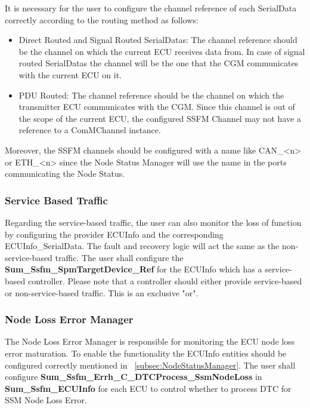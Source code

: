 It is necessary for the user to configure the channel reference of each SerialData correctly according to the routing method as follows:

\begin{itemize}
    \item Direct Routed and Signal Routed SerialDatas: The channel reference should be the channel on which the current ECU receives data from. In case of signal routed SerialDatas the channel will be the one that the CGM communicates with the current ECU on it.
    \item PDU Routed: The channel reference should be the channel on which the transmitter ECU communicates with the CGM. Since this channel is out of the scope of the current ECU, the configured SSFM Channel may not have a reference to a ComMChannel instance. 
\end{itemize}

Moreover, the SSFM channels should be configured with a name like CAN\_<n> or ETH\_<n> since the Node Status Manager will use the name in the ports communicating the Node Status.

\subsubsection{Service Based Traffic}
\label{subsec:LossOfCommService}
Regarding the service-based traffic, the user can also monitor the loss of function by configuring the provider ECUInfo and the corresponding ECUInfo\_SerialData.
The fault and recovery logic will act the same as the non-service-based traffic. The user shall configure the \\ \textbf{Sum\_Ssfm\_SpmTargetDevice\_Ref}
for the ECUInfo which has a service-based controller. Please note that a controller should either provide service-based or non-service-based traffic. This is an exclusive "or".


\subsubsection{Node Loss Error Manager}
\label{subsec:NodeLossErrorManager}

The Node Loss Error Manager is responsible for monitoring the ECU node loss error maturation. To enable the functionality the ECUInfo entities should be configured correctly mentioned in ~\ref{subsec:NodeStatusManager}. 
The user shall configure \textbf{Sum\_Ssfm\_Errh\_C\_DTCProcess\_SsmNodeLoss} in \textbf{Sum\_Ssfm\_ECUInfo} for each ECU to control whether to process DTC for SSM Node Loss Error. 

